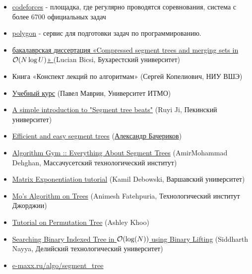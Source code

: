 {\begin{itemize}
	\item \href{https://codeforces.com}{codeforces} - площадка, где регулярно проводятся соревнования, система с более 6700 официальных задач
	
	\item \href{https://polygon.codeforces.com}{polygon} - сервис для подготовки задач по программированию.
	
	\item \href{https://codeforces.com/blog/entry/83170}{бакалаврская диссертация «Compressed segment trees and merging sets in $ \mathcal{O}(N \log U)$» } (Lucian Bicsi, Бухарестский университет)
	
	
	\item Книга «Конспект лекций по алгоритмам» (Сергей Копелиович, НИУ ВШЭ)
	
	\item \href{https://codeforces.com/edu/course/2}{Учебный курс} (Павел Маврин, Университет ИТМО)
	\item \href{https://codeforces.com/blog/entry/57319}{A simple introduction to "Segment tree beats"} (Ruyi Ji, Пекинский университет)
	
	\item \href{https://codeforces.com/blog/entry/18051}{Efficient and easy segment trees} (\href{http://finals.snarknews.info/index.cgi?data=2011/teams/knu&class=final2011&year=2011}{Александр Бачериков})
	
	\item \href{https://codeforces.com/blog/entry/15890}{Algorithm Gym :: Everything About Segment Trees} (AmirMohammad Dehghan, Массачусетский технологический институт)
	
	\item \href{https://codeforces.com/blog/entry/80195}{Matrix Exponentiation tutorial} (Kamil Debowski, Варшавский университет)
	
	\item \href{https://codeforces.com/blog/entry/43230}{Mo's Algorithm on Trees} (Animesh Fatehpuria, Технологический институт Джорджии)
	
	\item \href{https://codeforces.com/blog/entry/78898}{Tutorial on Permutation Tree} (Ashley Khoo)
	
	\item \href{https://codeforces.com/blog/entry/61364}{Searching Binary Indexed Tree in $ \mathcal{O}( \log(N))$ using Binary Lifting} (Siddharth Nayya, Делийский технологический университет)
	
	\item \href{https://e-maxx.ru/algo/segment_tree}{e-maxx.ru/algo/segment\_tree}
	

\end{itemize}}
